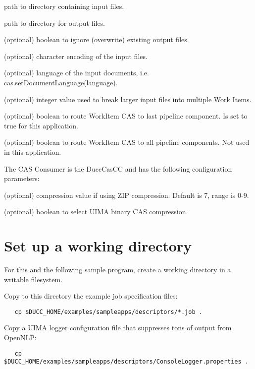 \begin{description}[labelindent=0.5in,leftmargin=0.5in]
    \item[InputDirectory] path to directory containing input files.
    \item[OutputDirectory] path to directory for output files.
    \item[IgnorePreviousOutput] (optional) boolean to ignore (overwrite) existing output files.
    \item[Encoding] (optional) character encoding of the input files.
    \item[Language] (optional) language of the input documents, i.e. cas.setDocumentLanguage(language).
    \item[BlockSize] (optional) integer value used to break larger input files into multiple Work Items.
    \item[SendToLast] (optional) boolean to route WorkItem CAS to last pipeline component. Is set to true for this application.
    \item[SendToAll] (optional) boolean to route WorkItem CAS to all pipeline components. Not used in this application.
\end{description}

The CAS Consumer is the DuccCasCC and has the following configuration parameters:

\begin{description}[labelindent=0.5in,leftmargin=0.5in]
  \item[XmiCompressionLevel] (optional) compression value if using ZIP compression. Default is 7, range is 0-9.
  \item[UseBinaryCompression] (optional) boolean to select UIMA binary CAS compression.
\end{description}

\section{Set up a working directory}
For this and the following sample program, create a working directory in a writable filesystem.

Copy to this directory the example job specification files:
\begin{verbatim}
   cp $DUCC_HOME/examples/sampleapps/descriptors/*.job .
\end{verbatim}

Copy a UIMA logger configuration file that suppresses tons of output from OpenNLP:
\begin{verbatim}
   cp $DUCC_HOME/examples/sampleapps/descriptors/ConsoleLogger.properties .
\end{verbatim}

